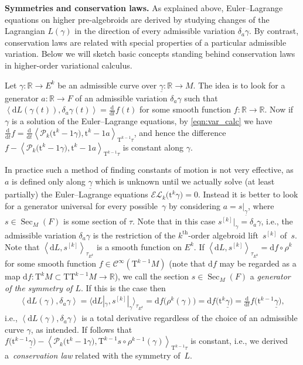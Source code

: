 \documentclass[pdftex]{sigma}
\newcommand{\thh}[1]{#1^{\mathrm{th}}} %
\newcommand{\R}{\mathbb{R}}
\newcommand{\und}{\underline}
\newcommand{\Sec}{\operatorname{Sec}}
\newcommand{\dd}{\mathrm{d}}
\newcommand{\ra}{\rightarrow}
\newcommand{\del}{\delta}
\newcommand{\prealg}{pre-algebroid} %
\newcommand{\T}{\mathrm{T}} %
\newcommand{\TT}[1]{\mathrm{T}^{#1}} %
\newcommand{\tclass}[2]{\bm{\mathrm{t}}^{#1}#2} %
\newcommand{\dbydt}{\frac{\mathrm{d}}{\mathrm{d}t}}
\newcommand{\Cf}{\mathcal{C}^\infty}
\def\<#1>{\left\langle #1\right\rangle}
\numberwithin{equation}{section}
\theoremstyle{definition}
\begin{document}
{\bf Symmetries and conservation laws.} As explained above, Euler--Lagrange equations on higher \prealg s are derived by studying changes of the Lagrangian $L(\gamma)$ in the direction of every admissible variation $\del_a\gamma$. By contrast, conservation laws are related with special properties of a particular admissible variation. Below we will sketch basic concepts standing behind conservation laws in higher-order variational calculus.

Let $\gamma\colon \R\ra E^k$ be an admissible curve over $\und{\gamma}\colon \R\ra M$. The idea is to look for a generator $a\colon \R\ra F$ of an admissible variation $\del_a\gamma$ such that $\<\dd L(\gamma (t)),\del_a\gamma (t)>=\dbydt f (t)$ for some smooth function $f\colon \R\ra \R$. Now if $\gamma$ is a solution of the Euler--Lagrange equations, by \eqref{eqn:var_calc} we have $\dbydt f=\dbydt{\<\mathcal{P}_k\big(\tclass{k-1}{\gamma}\big), \tclass{k-1}a>_{\TT{k-1}\tau}}$, and hence the difference $f-\<\mathcal{P}_k\big( \tclass{k-1}{\gamma}\big), \tclass{k-1}a>_{\TT{k-1}\tau}$ is constant along $\gamma$.

In practice such a method of finding constants of motion is not very effective, as $a$ is defined only along $\und{\gamma}$ which is unknown until we actually solve (at least partially) the Euler--Lagrange equations $\mathcal{EL}_k\big(\tclass k{\gamma}\big)=0$. Instead it is better to look for a generator universal for every possible~$\gamma$ by considering $a=s|_{\und{\gamma}}$, where $s\in\Sec_M(F)$ is some section of $\tau$. Note that in this case \mbox{$s^{[k]}|_{\gamma}=\del_a\gamma$}, i.e., the admissible variation $\del_a\gamma$ is the restriction of the $\thh{k}$-order algebroid lift~$s^{[k]}$ of~$s$.
Note that $\<\dd L,s^{[k]}>_{\tau_{E^k}}$ is a smooth function on $E^k$. If $\<\dd L,s^{[k]}>_{\tau_{E^k}}=\dd f \circ \rho^k$ for some smooth function $f\in \Cf(\TT{k-1}M)$ (note that $\dd f$ may be regarded as a map $\dd f\colon \TT{k}M\subset\T\TT{k-1}M\ra \R$), we call the section $s\in\Sec_M(F)$ a \emph{generator of the symmetry of $L$}. If this is the case then
\begin{gather*}
\<\dd L(\gamma),\del_a\gamma>=\big\langle\dd L|_{\gamma},s^{[k]}|_{\gamma}\big\rangle_{\tau_{E^k}}=\dd f\big(\rho^k(\gamma)\big)=\dd f\big( \tclass {k}{\und{\gamma}}\big)=\dbydt{f\big(\tclass{k-1}{\und{\gamma}}\big)},
\end{gather*}
 i.e., $\<\dd L(\gamma),\del_a\gamma>$ is a total derivative regardless of the choice of an admissible curve $\gamma$, as intended.
If follows that
$f\big( \tclass{k-1}{\und{\gamma}}\big)-\<\mathcal{P}_k\big(\tclass{k-1}{\gamma}\big), {\T^{k-1}{s}\circ \rho^{k-1}(\gamma)}>_{\TT{k-1}{\tau}}$ is constant, i.e., we derived a~\emph{conservation law}
related with the symmetry of~$L$.
\end{document}
